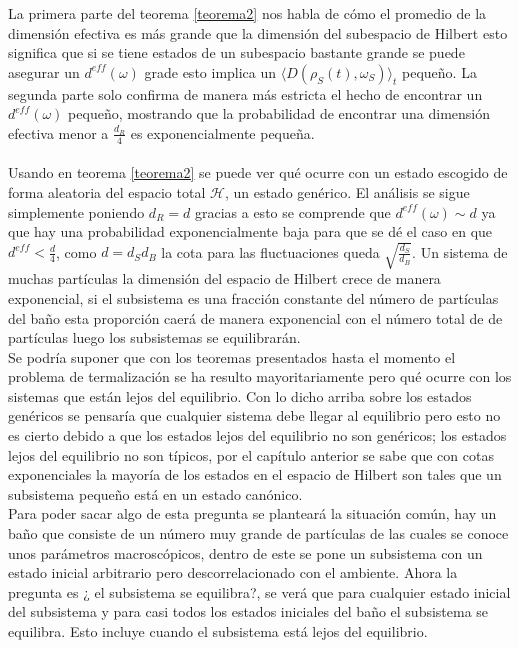 La primera parte del teorema \ref{teorema2} nos habla de cómo el promedio de la dimensión efectiva es más grande que la dimensión del subespacio de Hilbert esto significa que si se tiene estados de un subespacio bastante grande se puede asegurar un $d^{eff}(\omega)$ grade esto implica un $\langle D(\rho_{S}(t) ,\omega_{S}) \rangle_{t}$ pequeño. La segunda parte solo confirma de manera más estricta el hecho de encontrar un $d^{eff}(\omega)$ pequeño, mostrando que la probabilidad de encontrar una dimensión efectiva menor a $\frac{d_{R}}{4}$ es exponencialmente pequeña.\\
\\
Usando en teorema \ref{teorema2} se puede ver qué ocurre con un estado escogido de forma aleatoria del espacio total $\mathcal{H}$, un estado genérico. El análisis se sigue simplemente poniendo $d_{R}=d$ gracias a esto se comprende que $d^{eff}(\omega) \sim d$ ya que  hay una probabilidad exponencialmente baja para que se dé  el caso en que $d^{eff} < \frac{d}{4}$, como $d=d_{S}d_{B}$ la cota para las fluctuaciones queda $\sqrt{\frac{d_{S}}{d_{B}}}$. Un sistema de muchas partículas la dimensión del espacio de Hilbert crece de manera exponencial, si el subsistema es una fracción constante del número de partículas del baño esta proporción caerá de manera exponencial con el número total de de partículas luego los subsistemas se equilibrarán.
\\
Se podría suponer que  con los teoremas presentados hasta el momento el problema de termalización se ha resulto mayoritariamente pero qué ocurre con los sistemas que están lejos del equilibrio. Con lo dicho arriba sobre los estados genéricos se pensaría que cualquier sistema debe llegar al equilibrio pero esto no es cierto debido a que los estados lejos del equilibrio no son genéricos; los estados lejos del equilibrio no son típicos, por el capítulo anterior se sabe que con cotas exponenciales la mayoría de los estados en el espacio de Hilbert son tales que un subsistema pequeño está en un estado canónico.
\\
Para poder sacar algo de esta pregunta se planteará la situación común, hay un baño que consiste de un número muy grande de partículas de las cuales se conoce unos parámetros macroscópicos, dentro de este se pone un subsistema con un estado inicial arbitrario pero descorrelacionado con el ambiente. Ahora la pregunta es ¿ el subsistema se equilibra?, se verá que para cualquier estado inicial del subsistema y para casi todos los estados iniciales del baño el subsistema se equilibra. Esto incluye cuando el subsistema está lejos del equilibrio.
